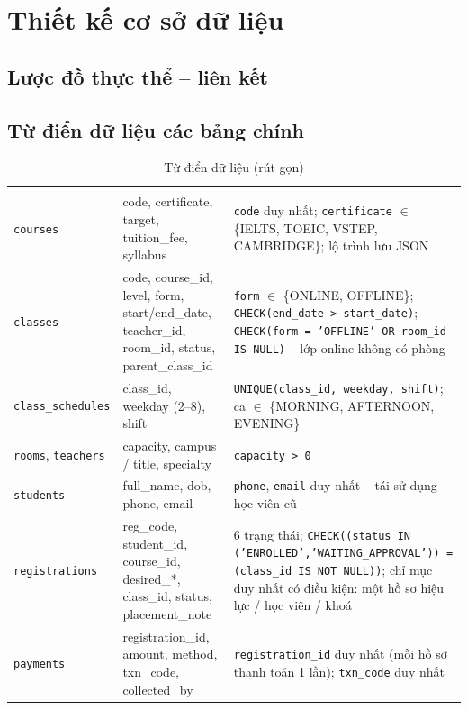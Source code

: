 \section{Thiết kế cơ sở dữ liệu}
\subsection{Lược đồ thực thể – liên kết}

\subsection{Từ điển dữ liệu các bảng chính}
\begin{xltabular}{\linewidth}{|L{3.4cm}|L{3.2cm}|Y|}
  \caption{Từ điển dữ liệu (rút gọn)}\label{tab:dict}\\ \hline
  \headrow {} &  &  \\ \hline
  \endfirsthead \hline
  \headrow {} &  &  \\ \hline
  \endhead
  \texttt{courses} & code, certificate, target, tuition\_fee, syllabus & \texttt{code} duy nhất; \texttt{certificate} $\in$ \{IELTS, TOEIC, VSTEP, CAMBRIDGE\}; lộ trình lưu JSON \\ \hline
  \texttt{classes} & code, course\_id, level, form, start/end\_date, teacher\_id, room\_id, status, parent\_class\_id & \texttt{form} $\in$ \{ONLINE, OFFLINE\}; \texttt{CHECK(end\_date > start\_date)}; \texttt{CHECK(form = 'OFFLINE' OR room\_id IS NULL)} – lớp online không có phòng \\ \hline
  \texttt{class\_schedules} & class\_id, weekday (2–8), shift & \texttt{UNIQUE(class\_id, weekday, shift)}; ca $\in$ \{MORNING, AFTERNOON, EVENING\} \\ \hline
  \texttt{rooms}, \texttt{teachers} & capacity, campus / title, specialty & \texttt{capacity > 0} \\ \hline
  \texttt{students} & full\_name, dob, phone, email & \texttt{phone}, \texttt{email} duy nhất – tái sử dụng học viên cũ \\ \hline
  \texttt{registrations} & reg\_code, student\_id, course\_id, desired\_*, class\_id, status, placement\_note & 6 trạng thái; \texttt{CHECK((status IN ('ENROLLED','WAITING\_APPROVAL')) = (class\_id IS NOT NULL))}; chỉ mục duy nhất có điều kiện: một hồ sơ hiệu lực / học viên / khoá \\ \hline
  \texttt{payments} & registration\_id, amount, method, txn\_code, collected\_by & \texttt{registration\_id} duy nhất (mỗi hồ sơ thanh toán 1 lần); \texttt{txn\_code} duy nhất \\ \hline

\end{xltabular}
